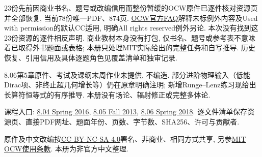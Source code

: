 23份先前因商业书名、题号或改编信用而整份暂缓的OCW原件已逐件核对资源页并全部恢复, 当前78份唯一PDF、874页. \href{https://mitocw.zendesk.com/hc/en-us/articles/4414756181403-How-is-all-rights-reserved-content-different-from-the-rest-of-OCW-content}{OCW官方FAQ}解释未标例外内容及Used with permission的默认CC适用, 明确All rights reserved例外另论. 本次没有找到这23份资源的逐件相反声明. 商业教材本身没有打包, 仅书名、题号或参考表不意味着已取得外书题面或表格; 本册只处理MIT实际给出的完整任务和自写推导. 历史恢复、引用信用及具体逐题角色见覆盖清单和独审记录.

8.06第5章原件、考试及课纲末周作业未提供, 不编造. 部分进阶物理输入（低能Dirac项、非终止超几何增长等）仍在原章明确注明; 新增Runge--Lenz练习现给出长算符恒等式的有序推导. 本册没有场论、辐射修正或完整多体论.

课程入口: \href{https://ocw.mit.edu/courses/8-04-quantum-physics-i-spring-2016/}{8.04 Spring 2016}, \href{https://ocw.mit.edu/courses/8-05-quantum-physics-ii-fall-2013/}{8.05 Fall 2013}, \href{https://ocw.mit.edu/courses/8-06-quantum-physics-iii-spring-2018/}{8.06 Spring 2018}. 逐文件清单保存资源页、直接PDF网址、题面年份、页数、字节数、SHA256、许可与贡献者.

原件及中文改编按\href{https://creativecommons.org/licenses/by-nc-sa/4.0/}{CC BY-NC-SA 4.0}署名、非商业、相同方式共享, 另参\href{https://ocw.mit.edu/pages/privacy-and-terms-of-use/}{MIT OCW使用条款}. 本册为非官方中文整理.
